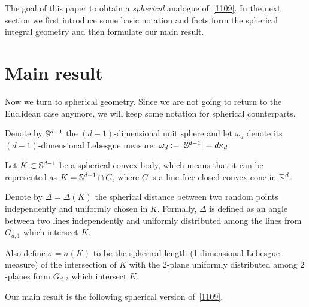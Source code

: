 \documentclass[12pt, reqno]{amsart}
\begin{document}
The goal of this paper to obtain a \emph{spherical} analogue of~\eqref{1109}. In the next section we first introduce some basic notation and facts form the spherical integral geometry and then formulate our main result.

\section{Main result}
Now we turn to spherical geometry. Since we are not going to return to the Euclidean case anymore, we will keep some notation for spherical counterparts.

Denote by $\mathbb{S}^{d-1}$ the $(d-1)$-dimensional unit sphere and let $\omega_d$ denote its $(d-1)$-dimensional Lebesgue measure: $\omega_d:=|\mathbb{S}^{d-1}|=d\kappa_d$.

Let $K\subset\mathbb{S}^{d-1}$ be  a spherical convex body, which means that it can be represented as $K=\mathbb{S}^{d-1}\cap C$, where $C$ is a line-free closed convex cone in $\mathbb{R}^d$.

Denote by $\Delta=\Delta(K)$ the spherical distance between two random points independently and uniformly chosen in $K$. Formally, $\Delta$ is defined as an angle between two lines independently and uniformly distributed among the lines from $G_{d,1}$ which intersect $K$.

Also define $\sigma=\sigma(K)$ to be the spherical length (1-dimensional Lebesgue measure) of the intersection of $K$ with the $2$-plane  uniformly distributed among $2$-planes form $G_{d,2}$ which intersect $K$.

Our main result is the following spherical version of~\eqref{1109}.
\end{document}
